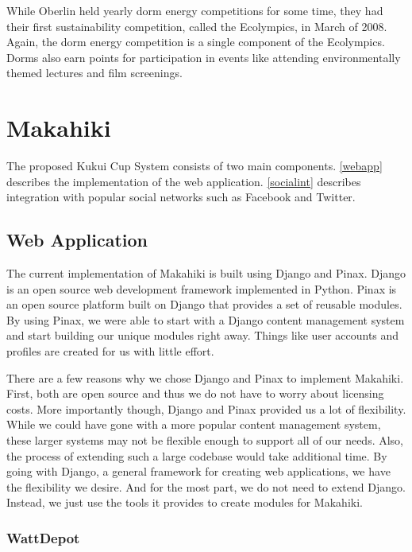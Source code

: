While Oberlin held yearly dorm energy competitions for some time, they had their first sustainability competition, called the Ecolympics, in March of 2008\cite{oberlin-history}.  Again, the dorm energy competition is a single component of the Ecolympics.  Dorms also earn points for participation in events like attending environmentally themed lectures and film screenings\cite{oberlin-news}.

\chapter{Makahiki}
\label{makahiki}

The proposed Kukui Cup System consists of two main components.  \autoref{webapp} describes the implementation of the web application.  \autoref{socialint} describes integration with popular social networks such as Facebook and Twitter.

\section{Web Application}
\label{webapp}

The current implementation of Makahiki is built using Django and Pinax.  Django\cite{django} is an open source web development framework implemented in Python.  Pinax\cite{pinax} is an open source platform built on Django that provides a set of reusable modules.  By using Pinax, we were able to start with a Django content management system and start building our unique modules right away.  Things like user accounts and profiles are created for us with little effort.

There are a few reasons why we chose Django and Pinax to implement Makahiki.  First, both are open source and thus we do not have to worry about licensing costs.  More importantly though, Django and Pinax provided us a lot of flexibility.  While we could have gone with a more popular content management system, these larger systems may not be flexible enough to support all of our needs.  Also, the process of extending such a large codebase would take additional time.  By going with Django, a general framework for creating web applications, we have the flexibility we desire.  And for the most part, we do not need to extend Django.  Instead, we just use the tools it provides to create modules for Makahiki.

\subsection{WattDepot}

